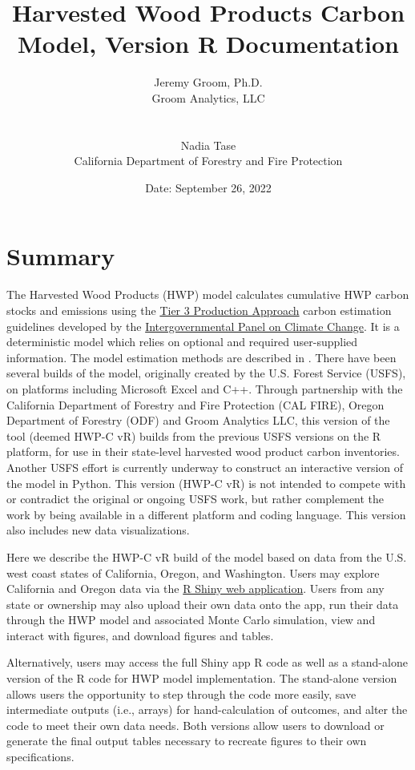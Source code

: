 \documentclass[
  openany]{book}
\title{Harvested Wood Products Carbon Model, Version R Documentation}
\author{Jeremy Groom, Ph.D.\\
Groom Analytics, LLC\\
\strut \\
Nadia Tase\\
California Department of Forestry and Fire Protection}
\date{Date: September 26, 2022}
\begin{document}
\maketitle

{
\setcounter{tocdepth}{1}
\tableofcontents
}
\hypertarget{sum}{%
\chapter{Summary}\label{sum}}

The Harvested Wood Products (HWP) model calculates cumulative HWP carbon stocks and emissions using the \href{https://www.ipcc-nggip.iges.or.jp/public/2006gl/pdf/4_Volume4/V4_04_Ch4_Forest_Land.pdf}{Tier 3 Production Approach} carbon estimation guidelines developed by the \href{https://www.ipcc.ch/}{Intergovernmental Panel on Climate Change}. It is a deterministic model which relies on optional and required user-supplied information. The model estimation methods are described in \textcite{stockmann2012}. There have been several builds of the model, originally created by the U.S. Forest Service (USFS), on platforms including Microsoft Excel and C++. Through partnership with the California Department of Forestry and Fire Protection (CAL FIRE), Oregon Department of Forestry (ODF) and Groom Analytics LLC, this version of the tool (deemed HWP-C vR) builds from the previous USFS versions on the R \autocite{R-base} platform, for use in their state-level harvested wood product carbon inventories. Another USFS effort is currently underway to construct an interactive version of the model in Python. This version (HWP-C vR) is not intended to compete with or contradict the original or ongoing USFS work, but rather complement the work by being available in a different platform and coding language. This version also includes new data visualizations.

Here we describe the HWP-C vR build of the model based on data from the U.S. west coast states of California, Oregon, and Washington. Users may explore California and Oregon data via the \href{https://groomanalyticsllc.shinyapps.io/HWP-C-vR/}{R Shiny web application}. Users from any state or ownership may also upload their own data onto the app, run their data through the HWP model and associated Monte Carlo simulation, view and interact with figures, and download figures and tables.

Alternatively, users may access the full Shiny app R code as well as a stand-alone version of the R code for HWP model implementation. The stand-alone version allows users the opportunity to step through the code more easily, save intermediate outputs (i.e., arrays) for hand-calculation of outcomes, and alter the code to meet their own data needs. Both versions allow users to download or generate the final output tables necessary to recreate figures to their own specifications.
\end{document}
